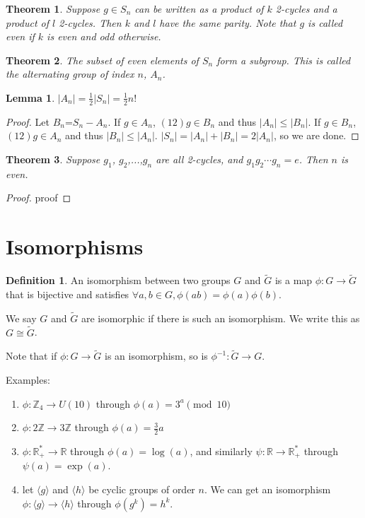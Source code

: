 \documentclass{article}
\theoremstyle{definition}
\newtheorem{definition}{Definition}
\theoremstyle{plain}
\newtheorem{theorem}{Theorem}
\theoremstyle{corollary}
\theoremstyle{lemma}
\newtheorem{lemma}{Lemma}
\begin{document}
\begin{theorem}
    Suppose $g\in S_n$ can be written as a product of $k$ 2-cycles and a product of $l$ 2-cycles. Then $k$ and $l$ have the same parity. Note that $g$ is called even if $k$ is even and odd otherwise.
\end{theorem}

\begin{theorem}
The subset of even elements of $S_n$ form a subgroup. This is called the alternating group of index $n$, $A_n$.
\end{theorem}

\begin{lemma}
$|A_n|=\frac 1 2 |S_n|=\frac 1 2 n!$
\end{lemma}

\begin{proof}
    Let $B_n$=$S_n-A_n$. If $g\in A_n$, $(12)g\in B_n$ and thus $|A_n|\leq |B_n|$. If $g\in B_n$, $(12)g\in A_n$ and thus $|B_n|\leq|A_n|$. $|S_n|=|A_n|+|B_n|=2|A_n|$, so we are done.
\end{proof}

\begin{theorem}
    Suppose $g_1$, $g_2$,...,$g_n$ are all 2-cycles, and $g_1g_2\cdots g_n=e$. Then $n$ is even.
\end{theorem}

\begin{proof}
    proof
\end{proof}

\section{Isomorphisms}
\begin{definition}
    An isomorphism between two groups $G$ and $\tilde{G}$ is a map $\phi:G\rightarrow\tilde{G}$ that is bijective and satisfies $\forall a,b\in G, \phi(ab)=\phi(a)\phi(b)$.

    We say $G$ and $\tilde{G}$ are isomorphic if there is such an isomorphism. We write this as $G\cong\tilde{G}$.
\end{definition}

Note that if $\phi:G\rightarrow\tilde{G}$ is an isomorphism, so is $\phi^{-1}:\tilde{G}\rightarrow G$.

Examples:
\begin{enumerate}
    \item $\phi:\mathbb{Z}_4\rightarrow U(10)$ through $\phi(a)=3^a\pmod{10}$
    \item $\phi:2\mathbb{Z}\rightarrow3\mathbb{Z}$ through $\phi(a)=\frac 3 2a$
    \item $\phi:\mathbb{R}_+^*\rightarrow\mathbb{R}$ through $\phi(a)=\log(a)$, and similarly $\psi:\mathbb{R}\rightarrow\mathbb{R}_+^*$ through $\psi(a)=\exp(a)$.
    \item let $\langle g\rangle$ and $\langle h\rangle$ be cyclic groups of order $n$. We can get an isomorphism $\phi:\langle g\rangle\rightarrow\langle h\rangle$ through $\phi(g^k)=h^k$.
\end{enumerate}
\end{document}
